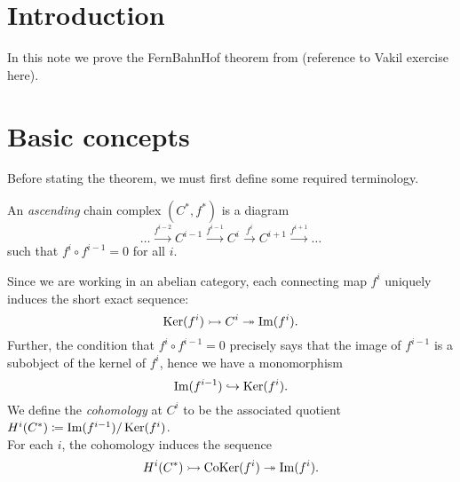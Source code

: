 \documentclass[a4paper]{article}
\def\into{\hookrightarrow}
\def\mono{\rightarrowtail}
\def\epi{\twoheadrightarrow}
\begin{document}
\maketitle
\section{Introduction}
In this note we prove the FernBahnHof theorem from (reference to Vakil exercise here).
\section{Basic concepts}
Before stating the theorem, we must first define some required terminology.\\

\begin{Definition}
    An \emph{ascending} chain complex $(C^*, f^*)$ is a diagram
    \[
        \dots \stackrel{f^{i-2}}{\to} C^{i-1} \stackrel{f^{i-1}}{\to} C^{i} \stackrel{f^{i}}{\to} C^{i+1} \stackrel{f^{i+1}}{\to} \dots
    \]
    such that $f^{i} \circ f^{i-1} = 0$ for all $i$.
\end{Definition}
Since we are working in an abelian category, each connecting map $f^i$ uniquely induces the short exact sequence:
\[
    \Ker(f^i) \mono C^{i} \epi \im(f^i).
\]
Further, the condition that $f^i \circ f^{i-1} = 0$ precisely says that the image of $f^{i-1}$ is a subobject of the kernel of $f^i$, hence we have a monomorphism
\[ %
    \im(f^{i-1}) \into \Ker(f^{i}).
\]
We define the \emph{cohomology} at $C^i$ to be the associated quotient $H^i(C^*) \coloneqq \operatorname{Im}(f^{i-1})/\operatorname{Ker}(f^i)$.\\

For each $i$, the cohomology induces the sequence
\[ %
    H^i(C^*) \mono \CoKer(f^i) \epi \im(f^i).
\]
\end{document}
